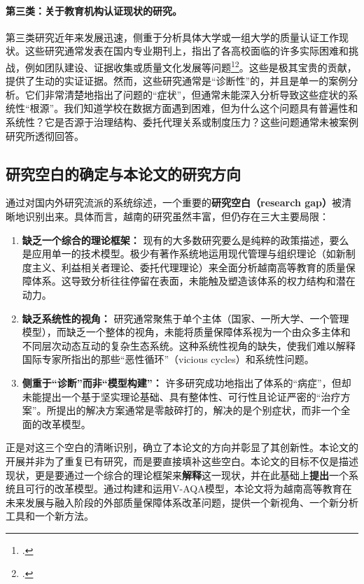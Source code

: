 \paragraph{第三类：关于教育机构认证现状的研究。}
第三类研究近年来发展迅速，侧重于分析具体大学或一组大学的质量认证工作现状。这些研究通常发表在国内专业期刊上，指出了各高校面临的许多实际困难和挑战，例如团队建设、证据收集或质量文化发展等问题\footcite{VJE_Challenges2023}\footcite{ExpertPerspectivesVN}。这些是极其宝贵的贡献，提供了生动的实证证据。然而，这些研究通常是“诊断性”的，并且是单一的案例分析。它们非常清楚地指出了问题的“症状”，但通常未能深入分析导致这些症状的系统性“根源”。我们知道学校在数据方面遇到困难，但为什么这个问题具有普遍性和系统性？它是否源于治理结构、委托代理关系或制度压力？这些问题通常未被案例研究所透彻回答。

\subsection{研究空白的确定与本论文的研究方向}
\label{subsec:xac_dinh_khoang_trong}

通过对国内外研究流派的系统综述，一个重要的\textbf{研究空白（research gap）}被清晰地识别出来。具体而言，越南的研究虽然丰富，但仍存在三大主要局限：
\begin{enumerate}
    \item \textbf{缺乏一个综合的理论框架：} 现有的大多数研究要么是纯粹的政策描述，要么是应用单一的技术模型。极少有著作系统地运用现代管理与组织理论（如新制度主义、利益相关者理论、委托代理理论）来全面分析越南高等教育的质量保障体系。这导致分析往往停留在表面，未能触及塑造该体系的权力结构和潜在动力。
    
    \item \textbf{缺乏系统性的视角：} 研究通常聚焦于单个主体（国家、一所大学、一个管理模型），而缺乏一个整体的视角，未能将质量保障体系视为一个由众多主体和不同层次动态互动的复杂生态系统。这种系统性视角的缺失，使我们难以解释国际专家所指出的那些“恶性循环”（vicious cycles）和系统性问题。
    
    \item \textbf{侧重于“诊断”而非“模型构建”：} 许多研究成功地指出了体系的“病症”，但却未能提出一个基于坚实理论基础、具有整体性、可行性且论证严密的“治疗方案”。所提出的解决方案通常是零敲碎打的，解决的是个别症状，而非一个全面的改革模型。
\end{enumerate}

正是对这三个空白的清晰识别，确立了本论文的方向并彰显了其创新性。本论文的开展并非为了重复已有研究，而是要直接填补这些空白。本论文的目标不仅是描述现状，更是要通过一个综合的理论框架来\textbf{解释}这一现状，并在此基础上\textbf{提出}一个系统且可行的改革模型。通过构建和运用V-AQA模型，本论文将为越南高等教育在未来发展与融入阶段的外部质量保障体系改革问题，提供一个新视角、一个新分析工具和一个新方法。


